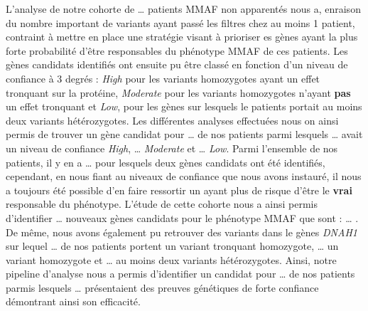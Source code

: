 \documentclass[12pt,twoside]{reedthesis}
\theoremstyle{definition}
\theoremstyle{definition}
\theoremstyle{remark}
\begin{document}
  L'analyse de notre cohorte de \ldots{} patients MMAF non apparentés nous
  a, enraison du nombre important de variants ayant passé les filtres chez
  au moins 1 patient, contraint à mettre en place une stratégie visant à
  prioriser es gènes ayant la plus forte probabilité d'être responsables
  du phénotype MMAF de ces patients. Les gènes candidats identifiés ont
  ensuite pu être classé en fonction d'un niveau de confiance à 3 degrés :
  \emph{High} pour les variants homozygotes ayant un effet tronquant sur
  la protéine, \emph{Moderate} pour les variants homozygotes n'ayant
  \textbf{pas} un effet tronquant et \emph{Low}, pour les gènes sur
  lesquels le patients portait au moins deux variants hétérozygotes. Les
  différentes analyses effectuées nous on ainsi permis de trouver un gène
  candidat pour \ldots{} de nos patients parmi lesquels \ldots{} avait un
  niveau de confiance \emph{High}, \ldots{} \emph{Moderate} et \ldots{}
  \emph{Low}. Parmi l'ensemble de nos patients, il y en a \ldots{} pour
  lesquels deux gènes candidats ont été identifiés, cependant, en nous
  fiant au niveaux de confiance que nous avons instauré, il nous a
  toujours été possible d'en faire ressortir un ayant plus de risque
  d'être le \textbf{vrai} responsable du phénotype. L'étude de cette
  cohorte nous a ainsi permis d'identifier \ldots{} nouveaux gènes
  candidats pour le phénotype MMAF que sont : \ldots{} . De même, nous
  avons également pu retrouver des variants dans le gènes \emph{DNAH1} sur
  lequel \ldots{} de nos patients portent un variant tronquant homozygote,
  \ldots{} un variant homozygote et \ldots{} au moins deux variants
  hétérozygotes. Ainsi, notre pipeline d'analyse nous a permis
  d'identifier un candidat pour \ldots{} de nos patients parmis lesquels
  \ldots{} présentaient des preuves génétiques de forte confiance
  démontrant ainsi son efficacité.
  
\end{document}
